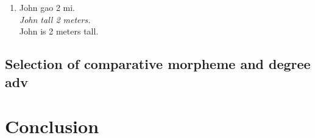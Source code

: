 \documentclass{ctexart}
\begin{document}
\begin{enumerate}[resume]
    \item \label{transitive_example}
    John gao 2 mi. \\
    \textit{John tall 2 meters.} \\
    John is 2 meters tall.
\end{enumerate}

\subsection{Selection of comparative morpheme and degree adv}


\section{Conclusion}

\newpage

\printbibliography
\end{document}
